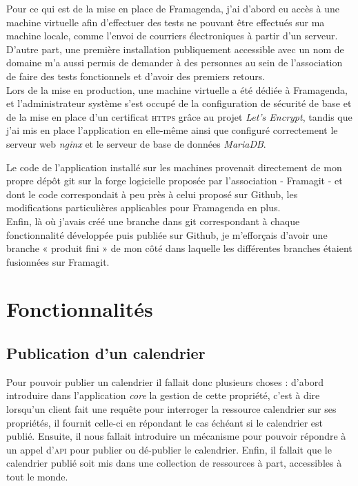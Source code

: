 \documentclass[10pt,a4paper, twoside]{report}
\begin{document}
	Pour ce qui est de la mise en place de Framagenda, j'ai d'abord eu accès à une machine virtuelle afin d'effectuer des tests ne pouvant être effectués sur ma machine locale, comme l'envoi de courriers électroniques à partir d'un serveur. D'autre part, une première installation publiquement accessible avec un nom de domaine m'a aussi permis de demander à des personnes au sein de l'association de faire des tests fonctionnels et d'avoir des premiers retours.
	\\
	
	Lors de la mise en production, une machine virtuelle a été dédiée à Framagenda, et l'administrateur système s'est occupé de la configuration de sécurité de base et de la mise en place d'un certificat \textsc{https} grâce au projet \textit{Let's Encrypt}, tandis que j'ai mis en place l'application en elle-même ainsi que configuré correctement le serveur web \textit{nginx} et le serveur de base de données \textit{MariaDB}.
	
	Le code de l'application installé sur les machines provenait directement de mon propre dépôt git sur la forge logicielle proposée par l'association - Framagit - et dont le code correspondait à peu près à celui proposé sur Github, les modifications particulières applicables pour Framagenda en plus.
	\\
	
	Enfin, là où j'avais créé une branche dans git correspondant à chaque fonctionnalité développée puis publiée sur Github, je m'efforçais d'avoir une branche « produit fini » de mon côté dans laquelle les différentes branches étaient fusionnées sur Framagit.
	
	\section{Fonctionnalités}
	\subsection{Publication d'un calendrier}
	Pour pouvoir publier un calendrier il fallait donc plusieurs choses : d'abord introduire dans l'application \textit{core} la gestion de cette propriété, c'est à dire lorsqu'un client fait une requête pour interroger la ressource calendrier sur ses propriétés, il fournit celle-ci en répondant le cas échéant si le calendrier est publié.
	Ensuite, il nous fallait introduire un mécanisme pour pouvoir répondre à un appel d'\textsc{api} pour publier ou dé-publier le calendrier. Enfin, il fallait que le calendrier publié soit mis dans une collection de ressources à part, accessibles à tout le monde.
	
\end{document}
